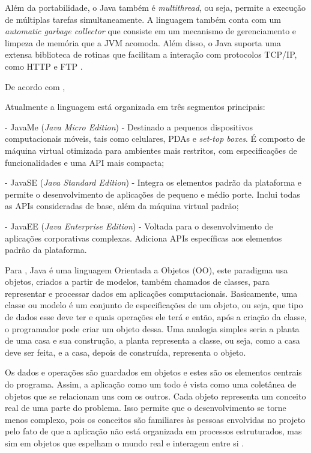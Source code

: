 \par Além da portabilidade, o Java também é \textit{multithread}, ou seja,
permite a execução de múltiplas tarefas simultaneamente. A linguagem também
conta com um \textit{automatic garbage collector} que consiste em um mecanismo
de gerenciamento e limpeza de memória que a JVM acomoda. Além disso, o Java
suporta uma extensa biblioteca de rotinas que facilitam a interação com protocolos 
TCP/IP, como HTTP e FTP \cite{livro_java_complete_references}.

\par De acordo com , 

\begin{citacao} Atualmente a linguagem está organizada em três segmentos
principais:


	- JavaMe (\textit{Java Micro Edition}) - Destinado a pequenos dispositivos
	computacionais móveis, tais como celulares, PDAs e \textit{set-top boxes}. É
	composto de máquina virtual otimizada para ambientes mais restritos, com
	especificações de funcionalidades e uma API mais compacta;
	  
	- JavaSE (\textit{Java Standard Edition}) - Integra os elementos padrão
	da plataforma e permite o desenvolvimento de aplicações de pequeno e médio porte. Inclui todas as APIs consideradas de base,
além da máquina virtual padrão;

	- JavaEE (\textit{Java Enterprise Edition}) - Voltada para o desenvolvimento
	de aplicações corporativas complexas. Adiciona APIs específicas aos elementos
	padrão da plataforma.
	

\end{citacao}


\par Para , Java é
uma linguagem Orientada a Objetos (OO), este paradigma usa objetos, criados a
partir de modelos, também chamados de classes, para representar e processar
dados em aplicações computacionais. Basicamente, uma classe ou modelo é um
conjunto de especificações de um objeto, ou seja, que tipo de dados esse deve
ter e quais operações ele terá e então, após a criação da classe, o programador
pode criar um objeto dessa. Uma analogia simples seria a planta de uma casa e sua
construção, a planta representa a classe, ou seja, como a casa deve ser feita, e a 
casa, depois de construída, representa o objeto.

\par Os dados e operações são guardados em objetos e estes são os elementos
centrais do programa. Assim, a aplicação como um todo é vista como uma coletânea
de objetos que se relacionam uns com os outros. Cada objeto representa um conceito real de uma parte do problema. 
Isso permite que o desenvolvimento se torne menos complexo, pois os conceitos são familiares
às pessoas envolvidas no projeto pelo fato de que a aplicação não está organizada em processos estruturados, mas 
sim em objetos que espelham o mundo real e interagem entre si  \cite{teste_doutorado_manzoni}.

